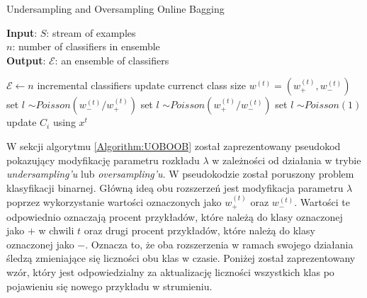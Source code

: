 \begin{algorithm}
    \caption{Undersampling and Oversampling Online Bagging \cite{Article:OBSecond}}\label{Algorithm:UOBOOB}
    \textbf{Input}: $S$: stream of examples \\
    \hspace*{12mm} $n$: number of classifiers in ensemble \\
    \textbf{Output}: $\mathcal{E}$: an ensemble of classifiers \\
    \begin{algorithmic}[1]
    \State $\mathcal{E} \gets n$ incremental classifiers
    \State update currenct class size $w^{(t)} = (w^{(t)}_{+}, w^{(t)}_{-})$
    \vspace{0.4em}
    \vspace{0.5em}
    \State set $l$ $\sim Poisson(w^{(t)}_{-}/w^{(t)}_{+})$
    \vspace{0.5em}
        \vspace{0.5em}
    \State set $l$ $\sim Poisson(w^{(t)}_{+}/w^{(t)}_{-})$
    \Else
    \State set $l$ $\sim Poisson(1)$
    \EndIf
    \State update $C_i$ using $x^t$
    \EndFor
    \EndFor
    \EndFor
    \end{algorithmic}
\end{algorithm}

\noindent W sekcji algorytmu \ref{Algorithm:UOBOOB} został zaprezentowany pseudokod pokazujący modyfikację parametru rozkładu $\lambda$ w zależności od działania w trybie \textit{undersampling'u} lub \textit{oversampling'u}. W pseudokodzie został poruszony problem klasyfikacji binarnej. Główną ideą obu rozszerzeń jest modyfikacja parametru $\lambda$ poprzez wykorzystanie wartości oznaczonych jako $w^{(t)}_{+}$ oraz $w^{(t)}_{-}$. Wartości te odpowiednio oznaczają procent przykładów, które należą do klasy oznaczonej jako $+$ w chwili $t$ oraz drugi procent przykładów, które należą do klasy oznaczonej jako $-$. Oznacza to, że oba rozszerzenia w ramach swojego działania śledzą zmieniające się liczności obu klas w czasie. Poniżej został zaprezentowany wzór, który jest odpowiedzialny za aktualizację liczności wszystkich klas po pojawieniu się nowego przykładu w strumieniu.

